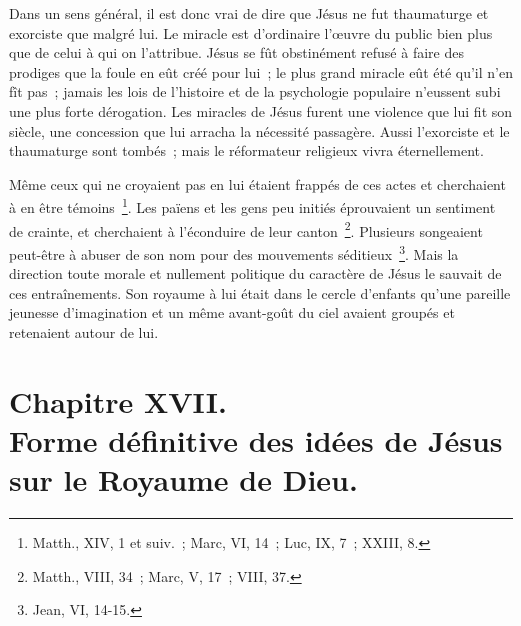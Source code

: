 \documentclass[french,twoside]{book} %
\newcommand\chapteropen{} %
\newcommand\chapterclose{} %
\begin{document}
Dans un sens général, il est donc vrai de dire que Jésus ne fut thaumaturge et exorciste que malgré lui. Le miracle est d’ordinaire l’œuvre du public bien plus que de celui à qui on l’attribue. Jésus se fût obstinément refusé à faire des prodiges que la foule en eût créé pour lui ; le plus grand miracle eût été qu’il n’en fît pas ; jamais les lois de l’histoire et de la psychologie populaire n’eussent subi une plus forte dérogation. Les miracles de Jésus furent une violence que lui fit son siècle, une concession que lui arracha la nécessité passagère. Aussi l’exorciste et le thaumaturge sont tombés ; mais le réformateur religieux vivra éternellement.\par
Même ceux qui ne croyaient pas en lui étaient frappés de ces actes et cherchaient à en être témoins \footnote{Matth., XIV, 1 et suiv. ; Marc, VI, 14 ; Luc, IX, 7 ; XXIII, 8.}. Les païens et les gens peu initiés éprouvaient un sentiment de crainte, et cherchaient à l’éconduire de leur canton \footnote{Matth., VIII, 34 ; Marc, V, 17 ; VIII, 37.}. Plusieurs songeaient peut-être à abuser de son nom pour des mouvements séditieux \footnote{Jean, VI, 14-15.}. Mais la direction toute morale et nullement politique du caractère de Jésus le sauvait de ces entraînements. Son royaume à lui était dans le cercle d’enfants qu’une pareille jeunesse d’imagination et un même avant-goût du ciel avaient groupés et retenaient autour de lui.
\chapterclose


\chapteropen
\chapter[{Chapitre XVII. Forme définitive des idées de Jésus sur le Royaume de Dieu.}]{Chapitre XVII.\\
 Forme définitive des idées de Jésus sur le Royaume de Dieu.}\renewcommand{\leftmark}{Chapitre XVII.\\
 Forme définitive des idées de Jésus sur le Royaume de Dieu.}
\end{document}
